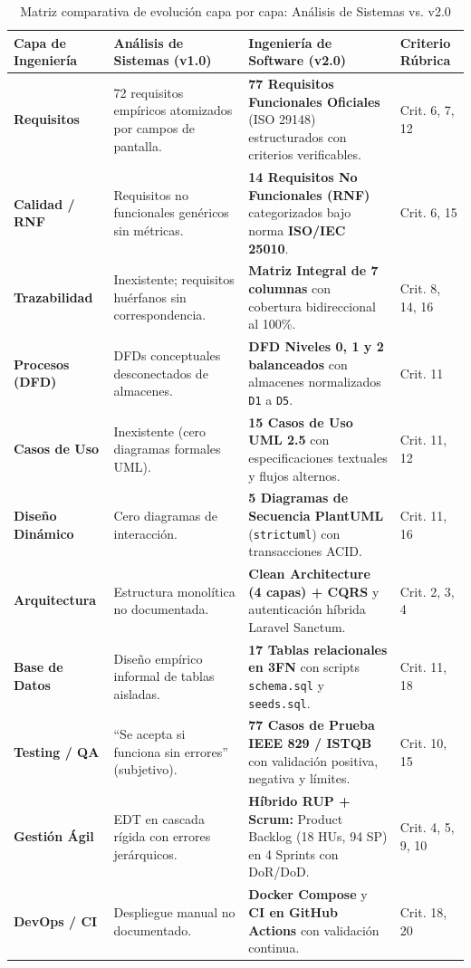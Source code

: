 \begin{table}[H]
\centering
\small
\begin{tabularx}{\textwidth}{>{\bfseries}p{2.6cm} Y Y >{\centering\arraybackslash}p{2.3cm}}
\toprule
\textbf{Capa de Ingeniería} & \textbf{Análisis de Sistemas (v1.0)} & \textbf{Ingeniería de Software (v2.0)} & \textbf{Criterio Rúbrica} \\
\midrule
Requisitos & 72 requisitos empíricos atomizados por campos de pantalla. & \textbf{77 Requisitos Funcionales Oficiales} (ISO 29148) estructurados con criterios verificables. & Crit. 6, 7, 12 \\
\addlinespace
Calidad / RNF & Requisitos no funcionales genéricos sin métricas. & \textbf{14 Requisitos No Funcionales (RNF)} categorizados bajo norma \textbf{ISO/IEC 25010}. & Crit. 6, 15 \\
\addlinespace
Trazabilidad & Inexistente; requisitos huérfanos sin correspondencia. & \textbf{Matriz Integral de 7 columnas} con cobertura bidireccional al 100\%. & Crit. 8, 14, 16 \\
\addlinespace
Procesos (DFD) & DFDs conceptuales desconectados de almacenes. & \textbf{DFD Niveles 0, 1 y 2 balanceados} con almacenes normalizados \texttt{D1} a \texttt{D5}. & Crit. 11 \\
\addlinespace
Casos de Uso & Inexistente (cero diagramas formales UML). & \textbf{15 Casos de Uso UML 2.5} con especificaciones textuales y flujos alternos. & Crit. 11, 12 \\
\addlinespace
Diseño Dinámico & Cero diagramas de interacción. & \textbf{5 Diagramas de Secuencia PlantUML} (\texttt{strictuml}) con transacciones ACID. & Crit. 11, 16 \\
\addlinespace
Arquitectura & Estructura monolítica no documentada. & \textbf{Clean Architecture (4 capas) + CQRS} y autenticación híbrida Laravel Sanctum. & Crit. 2, 3, 4 \\
\addlinespace
Base de Datos & Diseño empírico informal de tablas aisladas. & \textbf{17 Tablas relacionales en 3FN} con scripts \texttt{schema.sql} y \texttt{seeds.sql}. & Crit. 11, 18 \\
\addlinespace
Testing / QA & ``Se acepta si funciona sin errores'' (subjetivo). & \textbf{77 Casos de Prueba IEEE 829 / ISTQB} con validación positiva, negativa y límites. & Crit. 10, 15 \\
\addlinespace
Gestión Ágil & EDT en cascada rígida con errores jerárquicos. & \textbf{Híbrido RUP + Scrum:} Product Backlog (18 HUs, 94 SP) en 4 Sprints con DoR/DoD. & Crit. 4, 5, 9, 10 \\
\addlinespace
DevOps / CI & Despliegue manual no documentado. & \textbf{Docker Compose} y \textbf{CI en GitHub Actions} con validación continua. & Crit. 18, 20 \\
\bottomrule
\end{tabularx}
\caption{Matriz comparativa de evolución capa por capa: Análisis de Sistemas vs. v2.0}
\label{tab:matriz_transformacion}
\end{table}

